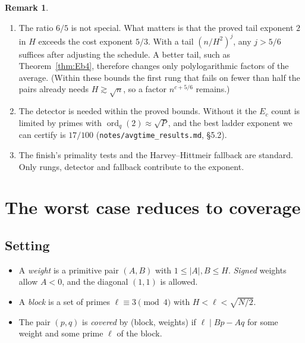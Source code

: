 \documentclass[11pt]{amsart}
\theoremstyle{definition}
\newtheorem{remark}[theorem]{Remark}
\newcommand{\ord}{\operatorname{ord}}
\begin{document}
\begin{remark}
\begin{enumerate}[label=(\alph*)]
\item The ratio $6/5$ is not special. What matters is that the proved tail exponent $2$ in $H$
  exceeds the cost exponent $5/3$. With a tail $(n/H^2)^j$, any $j>5/6$ suffices after adjusting
  the schedule. A better tail, such as Theorem~\ref{thm:Eb4}, therefore changes only
  polylogarithmic factors of the average. (Within these bounds the first rung that fails on
  fewer than half the pairs already needs $H\gtrsim\sqrt n$, so a factor $n^{c+5/6}$ remains.)
\item The detector is needed within the proved bounds. Without it the $E_c$ count is limited by
  primes with $\ord_q(2)\approx\sqrt P$, and the best ladder exponent we can certify is
  $17/100$ (\texttt{notes/avgtime\_results.md}, \S5.2).
\item The finish's primality tests and the Harvey--Hittmeir fallback are standard. Only rungs,
  detector and fallback contribute to the exponent.
\end{enumerate}
\end{remark}

\section{The worst case reduces to coverage}\label{sec:worst}

\subsection{Setting}
\begin{itemize}
\item A \emph{weight} is a primitive pair $(A,B)$ with $1\le|A|,B\le H$. \emph{Signed} weights
  allow $A<0$, and the diagonal $(1,1)$ is allowed.
\item A \emph{block} is a set of primes $\ell\equiv3\pmod4$ with $H<\ell<\sqrt{N/2}$.
\item The pair $(p,q)$ is \emph{covered} by (block, weights) if $\ell\mid Bp-Aq$ for some weight
  and some prime $\ell$ of the block.
\end{itemize}
\end{document}
